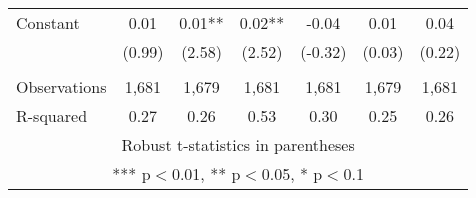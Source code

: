 \documentclass[]{article}
\begin{document}
\begin{tabular}{lcccccc}
Constant & 0.01 & 0.01** & 0.02** & -0.04 & 0.01 & 0.04 \\
 & (0.99) & (2.58) & (2.52) & (-0.32) & (0.03) & (0.22) \\
 &  &  &  &  &  &  \\
Observations & 1,681 & 1,679 & 1,681 & 1,681 & 1,679 & 1,681 \\
 R-squared & 0.27 & 0.26 & 0.53 & 0.30 & 0.25 & 0.26 \\ \hline
\multicolumn{7}{c}{ Robust t-statistics in parentheses} \\
\multicolumn{7}{c}{ *** p$<$0.01, ** p$<$0.05, * p$<$0.1} \\
\end{tabular}
\end{document}
